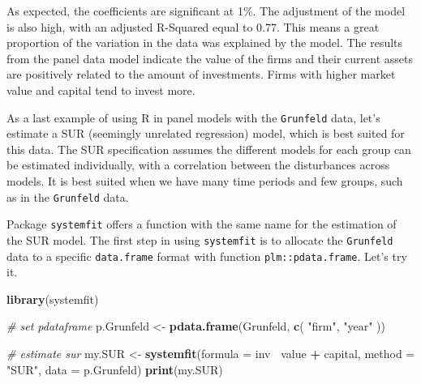 \documentclass[11pt,]{book}
\newenvironment{Shaded}{\begin{snugshade}}{\end{snugshade}}
\newcommand{\KeywordTok}[1]{\textcolor[rgb]{0.27,0.27,0.27}{\textbf{#1}}}
\newcommand{\DataTypeTok}[1]{\textcolor[rgb]{0.27,0.27,0.27}{#1}}
\newcommand{\StringTok}[1]{\textcolor[rgb]{0.5,0.5,0.5}{#1}}
\newcommand{\CommentTok}[1]{\textcolor[rgb]{0.56,0.35,0.01}{\textit{#1}}}
\newcommand{\OperatorTok}[1]{\textcolor[rgb]{0.81,0.36,0.00}{\textbf{#1}}}
\newcommand{\NormalTok}[1]{#1}
\begin{document}
As expected, the coefficients are significant at 1\%. The adjustment of
the model is also high, with an adjusted R-Squared equal to 0.77. This
means a great proportion of the variation in the data was explained by
the model. The results from the panel data model indicate the value of
the firms and their current assets are positively related to the amount
of investments. Firms with higher market value and capital tend to
invest more.

As a last example of using R in panel models with the \texttt{Grunfeld}
data, let's estimate a SUR (seemingly unrelated regression) model, which
is best suited for this data. The SUR specification assumes the
different models for each group can be estimated individually, with a
correlation between the disturbances across models. It is best suited
when we have many time periods and few groups, such as in the
\texttt{Grunfeld} data.

Package \texttt{systemfit} offers a function with the same name for the
estimation of the SUR model. The first step in using \texttt{systemfit}
is to allocate the \texttt{Grunfeld} data to a specific
\texttt{data.frame} format with function \texttt{plm::pdata.frame}.
Let's try it.

\begin{Shaded}
\begin{Highlighting}[]
\KeywordTok{library}\NormalTok{(systemfit)}

\CommentTok{# set pdataframe}
\NormalTok{p.Grunfeld <-}\StringTok{ }\KeywordTok{pdata.frame}\NormalTok{(Grunfeld, }\KeywordTok{c}\NormalTok{( }\StringTok{"firm"}\NormalTok{, }\StringTok{"year"}\NormalTok{ ))}

\CommentTok{# estimate sur}
\NormalTok{my.SUR <-}\StringTok{ }\KeywordTok{systemfit}\NormalTok{(}\DataTypeTok{formula =}\NormalTok{ inv }\OperatorTok{~}\NormalTok{value }\OperatorTok{+}\StringTok{ }\NormalTok{capital,}
                    \DataTypeTok{method =}  \StringTok{"SUR"}\NormalTok{,}
                    \DataTypeTok{data =}\NormalTok{ p.Grunfeld)}
\KeywordTok{print}\NormalTok{(my.SUR)}
\end{Highlighting}
\end{Shaded}
\end{document}
